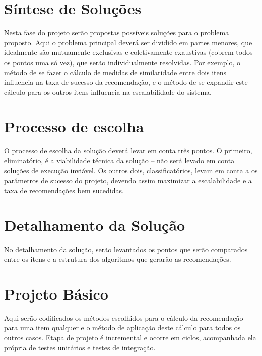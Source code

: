 \section{Síntese de Soluções} %
\label{sec:s_ntese_de_solu_es}


Nesta fase do projeto serão propostas possíveis soluções para o problema proposto. Aqui o problema principal deverá ser dividido em partes menores, que idealmente são mutuamente exclusivas e coletivamente exaustivas (cobrem todos os pontos uma só vez), que serão individualmente resolvidas. Por exemplo, o método de se fazer o cálculo de medidas de similaridade entre dois itens influencia na taxa de sucesso da recomendação, e o método de se expandir este cálculo para os outros itens influencia na escalabilidade do sistema.

\section{Processo de escolha} %
\label{sec:processo_de_escolha}


O processo de escolha da solução deverá levar em conta três pontos. O primeiro, eliminatório, é a viabilidade técnica da solução -- não será levado em conta soluções de execução inviável. Os outros dois, classificatórios, levam em conta a os parâmetros de sucesso do projeto, devendo assim maximizar a escalabilidade e a taxa de recomendações bem sucedidas.

\section{Detalhamento da Solução} %
\label{sec:detalhamento_da_solu_o}


No detalhamento da solução, serão levantados os pontos que serão comparados entre os itens e a estrutura dos algoritmos que gerarão as recomendações.

\section{Projeto Básico} %
\label{sec:projeto_b_sico}


Aqui serão codificados os métodos escolhidos para o cálculo da recomendação para uma item qualquer e o método de aplicação deste cálculo para todos os outros casos. Etapa de projeto é incremental e ocorre em ciclos, acompanhada ela própria de testes unitários e testes de integração.   

